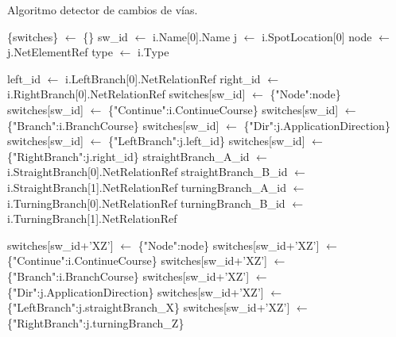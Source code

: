     \begin{algorithm}[H]
            \caption{Algoritmo detector de cambios de vías.}
            \label{alg:switches}
            \begin{algorithmic}
                \STATE \{switches\} $\gets$ \{\}
                            \STATE sw\_id $\gets$ i.Name[0].Name
                            \STATE j $\gets$ i.SpotLocation[0]
                            \STATE node $\gets$ j.NetElementRef
                            \STATE type $\gets$ i.Type
                            
	                           	\STATE left\_id $\gets$ i.LeftBranch[0].NetRelationRef
	                           	\STATE right\_id $\gets$ i.RightBranch[0].NetRelationRef
	                           	\STATE switches[sw\_id] $\gets$ \{"Node":node\}
	                           	\STATE switches[sw\_id] $\gets$ \{"Continue":i.ContinueCourse\}
	                           	\STATE switches[sw\_id] $\gets$ \{"Branch":i.BranchCourse\}
	                           	\STATE switches[sw\_id] $\gets$ \{"Dir":j.ApplicationDirection\}
	                           	\STATE switches[sw\_id] $\gets$ \{"LeftBranch":j.left\_id\}
	                           	\STATE switches[sw\_id] $\gets$ \{"RightBranch":j.right\_id\}
                            \ENDIF
	                            \STATE straightBranch\_A\_id $\gets$ i.StraightBranch[0].NetRelationRef
	                            \STATE straightBranch\_B\_id $\gets$ i.StraightBranch[1].NetRelationRef
	                            \STATE turningBranch\_A\_id $\gets$ i.TurningBranch[0].NetRelationRef
	                            \STATE turningBranch\_B\_id $\gets$ i.TurningBranch[1].NetRelationRef
	                            
		                            \STATE switches[sw\_id+'XZ'] $\gets$ \{"Node":node\}
		                            \STATE switches[sw\_id+'XZ'] $\gets$ \{"Continue":i.ContinueCourse\}
		                            \STATE switches[sw\_id+'XZ'] $\gets$ \{"Branch":i.BranchCourse\}
		                            \STATE switches[sw\_id+'XZ'] $\gets$ \{"Dir":j.ApplicationDirection\}
		                            \STATE switches[sw\_id+'XZ'] $\gets$ \{"LeftBranch":j.straightBranch\_X\}
		                            \STATE switches[sw\_id+'XZ'] $\gets$ \{"RightBranch":j.turningBranch\_Z\}
	      						\ENDFOR
                            \ENDIF
                            

\end{algorithmic}
\end{algorithm}
